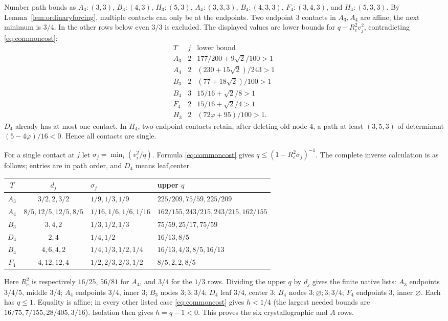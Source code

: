 \documentclass[11pt]{article}
\theoremstyle{remark}
\newcommand{\ph}{\varphi}
\begin{document}
Number path bonds as $A_3:(3,3)$, $B_3:(4,3)$, $H_3:(5,3)$,
$A_4:(3,3,3)$, $B_4:(4,3,3)$, $F_4:(3,4,3)$, and
$H_4:(5,3,3)$. By Lemma~\ref{lem:ordinaryforcing}, multiple
contacts can only be at the endpoints. Two endpoint $3$ contacts
in $A_3,A_4$ are affine; the next minimum is $3/4$. In the other
rows below even $3/3$ is excluded. The displayed values are lower
bounds for $q-R_e^2v_j^2$, contradicting \eqref{eq:commoncost}:
\[
\begin{array}{c|c|c}
T&j&\text{lower bound}\\ \hline
A_3&2&177/200+9\sqrt2/100>1\\
A_4&2&(230+15\sqrt2)/243>1\\
B_3&2&(77+18\sqrt2)/100>1\\
B_4&3&15/16+\sqrt2/8>1\\
F_4&2&15/16+\sqrt2/4>1\\
H_3&2&(72\ph+95)/100>1.
\end{array}
\]
$D_4$ already has at most one contact. In $H_4$, two endpoint
contacts retain, after deleting old node $4$, a path at least
$(3,5,3)$ of determinant $(5-4\ph)/16<0$. Hence all contacts
are single.

For a single contact at $j$ let
$\sigma_j=\min_i(v_i^2/q)$. Formula \eqref{eq:commoncost} gives
$q\le(1-R_e^2\sigma_j)^{-1}$. The complete inverse calculation
is as follows; entries are in path order, and $D_4$ means leaf,center.
\begin{center}\small
\begin{tabular}{ccll}
\toprule
$T$&$d_j$&$\sigma_j$&upper $q$\\ \midrule
$A_3$&$3/2,2,3/2$&$1/9,1/3,1/9$&$225/209,75/59,225/209$\\
$A_4$&$8/5,12/5,12/5,8/5$&$1/16,1/6,1/6,1/16$&$162/155,243/215,243/215,162/155$\\
$B_3$&$3,4,2$&$1/3,1/2,1/3$&$75/59,25/17,75/59$\\
$D_4$&$2,4$&$1/4,1/2$&$16/13,8/5$\\
$B_4$&$4,6,4,2$&$1/4,1/3,1/2,1/4$&$16/13,4/3,8/5,16/13$\\
$F_4$&$4,12,12,4$&$1/2,2/3,2/3,1/2$&$8/5,2,2,8/5$\\ \bottomrule
\end{tabular}\end{center}
Here $R_e^2$ is respectively $16/25$, $56/81$ for $A_4$, and
$3/4$ for the $1/3$ rows. Dividing the upper $q$ by $d_j$
gives the finite native lists:
$A_3$ endpoints $3/4/5$, middle $3/4$;
$A_4$ endpoints $3/4$, inner $3$;
$B_3$ nodes $3;3;3/4$;
$D_4$ leaf $3/4$, center $3$;
$B_4$ nodes $3;\varnothing;3;3/4$;
$F_4$ endpoints $3$, inner $\varnothing$.
Each has $q\le1$. Equality is affine; in every other listed case
\eqref{eq:commoncost} gives $h<1/4$ (the largest needed bounds are
$16/75,7/155,28/405,3/16$). Isolation then gives $h=q-1<0$.
This proves the six crystallographic and $A$ rows.
\end{document}
